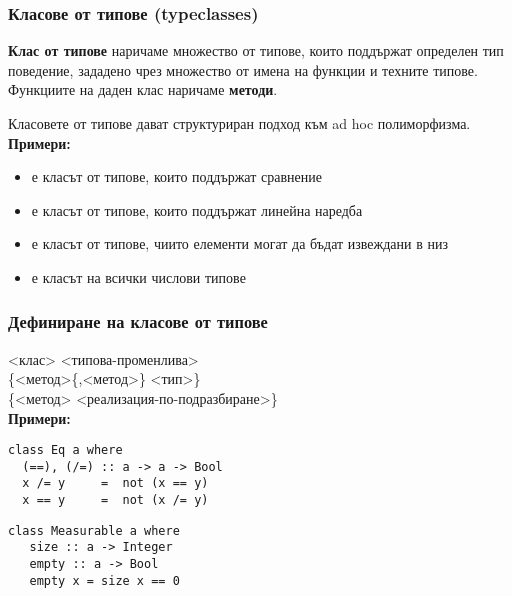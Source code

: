 \documentclass[alsotrans]{beamerswitch}
\begin{document}
\begin{frame}
  \frametitle{Класове от типове (typeclasses)}

  \begin{definition}
    \textbf{Клас от типове} наричаме множество от типове, които поддържат определен тип поведение, зададено чрез множество от имена на функции и техните типове. \pause Функциите на даден клас наричаме \textbf{методи}.
  \end{definition}
  \pause
  Класовете от типове дават структуриран подход към ad hoc полиморфизма.\\
  \pause
  \textbf{Примери:}
  \begin{itemize}[<+->]
  \item {} е класът от типове, които поддържат сравнение
  \item {} е класът от типове, които поддържат линейна наредба
  \item {} е класът от типове, чиито елементи могат да бъдат
    извеждани в низ
  \item {} е класът на всички числови типове
  \end{itemize}
\end{frame}

\begin{frame}[fragile]
  \frametitle{Дефиниране на класове от типове}
   <клас> <типова-променлива>\\
  \hspace{1em}\{<метод>\{,<метод>\} \tta{::} <тип>\}\\
  \hspace{1em}\{<метод> \tta{=} <реализация-по-подразбиране>\}\\[3ex]
  \pause
  \textbf{Примери:}\\
\begin{lstlisting}
class Eq a where
  (==), (/=) :: a -> a -> Bool
  x /= y     =  not (x == y)
  x == y     =  not (x /= y)
\end{lstlisting}
\pause
\begin{lstlisting}
class Measurable a where
   size :: a -> Integer
   empty :: a -> Bool
   empty x = size x == 0
\end{lstlisting}
\end{frame}
\end{document}

